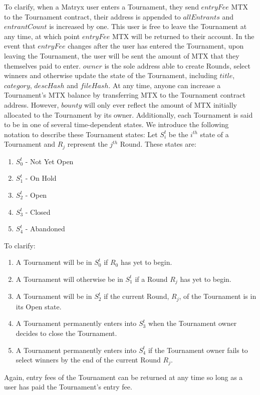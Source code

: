 \documentclass[a4paper, 10pt, conference]{ieeeconf}      %
\begin{document}
To clarify, when a Matryx user enters a Tournament, they send $entryFee$ MTX to the Tournament contract, their address is appended to $allEntrants$ and $entrantCount$ is increased by one. This user is free to leave the Tournament at any time, at which point $entryFee$ MTX will be returned to their account. In the event that $entryFee$ changes after the user has entered the Tournament, upon leaving the Tournament, the user will be sent the amount of MTX that they themselves paid to enter. $owner$ is the sole address able to create Rounds, select winners and otherwise update the state of the Tournament, including $title$, $category$, $descHash$ and $fileHash$. At any time, anyone can increase a Tournament's MTX balance by transferring MTX to the Tournament contract address. However, $bounty$ will only ever reflect the amount of MTX initially allocated to the Tournament by its owner. Additionally, each Tournament is said to be in one of several time-dependent states. We introduce the following notation to describe these Tournament states: Let $S_i^t$ be the $i^{th}$ state of a Tournament and $R_j$ represent the $j^{th}$ Round. These states are:

\begin{enumerate}
\item $S_{0}^t$ - Not Yet Open
\item $S_{1}^t$ - On Hold
\item $S_{2}^t$ - Open
\item $S_{3}^t$ - Closed
\item $S_{4}^t$ - Abandoned
\end{enumerate}
\bigskip


To clarify: 

\begin{enumerate}
\item A Tournament will be in $S_{0}^t$ if $R_0$ has yet to begin.
\item A Tournament will otherwise be in $S_{1}^t$ if a Round $R_j$ has yet to begin.
\item A Tournament will be in $S_{2}^t$ if the current Round, $R_j$, of the Tournament is in its Open state.
\item A Tournament permanently enters into $S_{3}^t$ when the Tournament owner decides to close the Tournament.
\item A Tournament permanently enters into $S_{4}^t$ if the Tournament owner fails to select winners by the end of the current Round $R_j$.
\end{enumerate}
Again, entry fees of the Tournament can be returned at any time so long as a user has paid the Tournament's entry fee.
\end{document}
